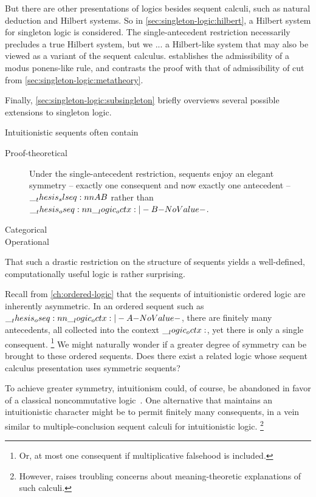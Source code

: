 But there are other presentations of logics besides sequent calculi, such as natural deduction and Hilbert systems.
So in \cref{sec:singleton-logic:hilbert}, a Hilbert system for singleton logic is considered.
The single-antecedent restriction necessarily precludes a true Hilbert system, but we ... a Hilbert-like system that may also be viewed as a variant of the sequent calculus.
 establishes the admissibility of a modus ponens-like rule, and contrasts the proof with that of admissibility of cut from \cref{sec:singleton-logic:metatheory}.

Finally, \cref{sec:singleton-logic:subsingleton} briefly overviews several possible extensions to singleton logic.



Intuitionistic sequents often contain
\begin{description}
\item[Proof-theoretical]
  Under the single-antecedent restriction, sequents enjoy an elegant symmetry -- exactly one consequent and now exactly one antecedent -- $\slseq{A |- B}$ rather than $\oseq{\octx |- B}$.
\item[Categorical]
\item[Operational] 
\end{description}
That such a drastic restriction on the structure of sequents yields a well-defined, computationally useful logic is rather surprising.

Recall from \cref{ch:ordered-logic} that the sequents of intuitionistic ordered logic are inherently asymmetric.
In an ordered sequent such as $\oseq{\octx |- A}$, there are finitely many antecedents, all collected into the context $\__logic_octx:$, yet there is only a single consequent.%
\footnote{Or, at most one consequent if multiplicative falsehood is included.}
We might naturally wonder if a greater degree of symmetry can be brought to these ordered sequents.
Does there exist a related logic whose sequent calculus presentation uses symmetric sequents?

To achieve greater symmetry, intuitionism could, of course, be abandoned in favor of a classical noncommutative logic~\autocite{Abrusci:JSL91}.
One alternative that maintains an intuitionistic character might be to permit finitely many consequents, in a vein similar to multiple-conclusion sequent calculi for intuitionistic logic\autocite{??}.%
\footnote{However, \textcite{Steinberger:JPL11} raises troubling concerns about meaning-theoretic explanations of such calculi.}

